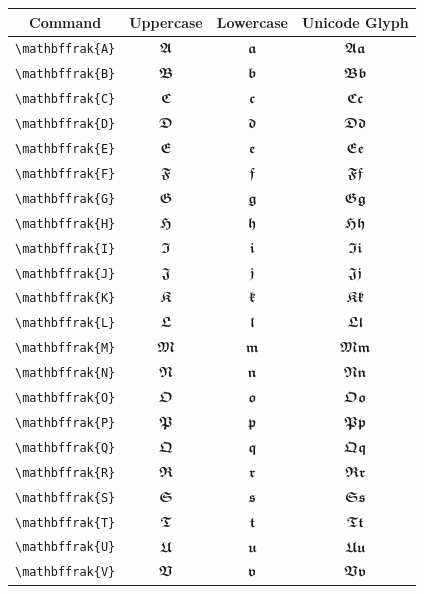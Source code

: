 \documentclass[12pt,a4paper]{article}
\begin{document}
\begin{longtable}{|c|c|c|c|}
\hline
\textbf{Command} & \textbf{Uppercase} & \textbf{Lowercase} & \textbf{Unicode Glyph} \\
\hline
\verb|\mathbffrak{A}| & $\mathbffrak{A}$ & $\mathbffrak{a}$ & $ 𝕬 𝖆 $ \\
\verb|\mathbffrak{B}| & $\mathbffrak{B}$ & $\mathbffrak{b}$ & $ 𝕭 𝖇 $ \\
\verb|\mathbffrak{C}| & $\mathbffrak{C}$ & $\mathbffrak{c}$ & $ 𝕮 𝖈 $ \\
\verb|\mathbffrak{D}| & $\mathbffrak{D}$ & $\mathbffrak{d}$ & $ 𝕯 𝖉 $ \\
\verb|\mathbffrak{E}| & $\mathbffrak{E}$ & $\mathbffrak{e}$ & $ 𝕰 𝖊 $ \\
\verb|\mathbffrak{F}| & $\mathbffrak{F}$ & $\mathbffrak{f}$ & $ 𝕱 𝖋 $ \\
\verb|\mathbffrak{G}| & $\mathbffrak{G}$ & $\mathbffrak{g}$ & $ 𝕲 𝖌 $ \\
\verb|\mathbffrak{H}| & $\mathbffrak{H}$ & $\mathbffrak{h}$ & $ 𝕳 𝖍 $ \\
\verb|\mathbffrak{I}| & $\mathbffrak{I}$ & $\mathbffrak{i}$ & $ 𝕴 𝖎 $ \\
\verb|\mathbffrak{J}| & $\mathbffrak{J}$ & $\mathbffrak{j}$ & $ 𝕵 𝖏 $ \\
\verb|\mathbffrak{K}| & $\mathbffrak{K}$ & $\mathbffrak{k}$ & $ 𝕶 𝖐 $ \\
\verb|\mathbffrak{L}| & $\mathbffrak{L}$ & $\mathbffrak{l}$ & $ 𝕷 𝖑 $ \\
\verb|\mathbffrak{M}| & $\mathbffrak{M}$ & $\mathbffrak{m}$ & $ 𝕸 𝖒 $ \\
\verb|\mathbffrak{N}| & $\mathbffrak{N}$ & $\mathbffrak{n}$ & $ 𝕹 𝖓 $ \\
\verb|\mathbffrak{O}| & $\mathbffrak{O}$ & $\mathbffrak{o}$ & $ 𝕺 𝖔 $ \\
\verb|\mathbffrak{P}| & $\mathbffrak{P}$ & $\mathbffrak{p}$ & $ 𝕻 𝖕 $ \\
\verb|\mathbffrak{Q}| & $\mathbffrak{Q}$ & $\mathbffrak{q}$ & $ 𝕼 𝖖 $ \\
\verb|\mathbffrak{R}| & $\mathbffrak{R}$ & $\mathbffrak{r}$ & $ 𝕽 𝖗 $ \\
\verb|\mathbffrak{S}| & $\mathbffrak{S}$ & $\mathbffrak{s}$ & $ 𝕾 𝖘 $ \\
\verb|\mathbffrak{T}| & $\mathbffrak{T}$ & $\mathbffrak{t}$ & $ 𝕿 𝖙 $ \\
\verb|\mathbffrak{U}| & $\mathbffrak{U}$ & $\mathbffrak{u}$ & $ 𝖀 𝖚 $ \\
\verb|\mathbffrak{V}| & $\mathbffrak{V}$ & $\mathbffrak{v}$ & $ 𝖁 𝖛 $ \\

\end{longtable}
\end{document}
